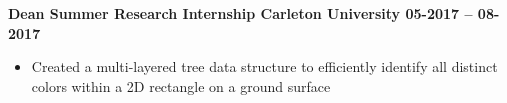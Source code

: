 \textbf{Dean Summer Research Internship \hspace{-11mm} \hfill Carleton University \hfill 05-2017 -- 08-2017}\par

\begin{itemize}
	\item Created a multi-layered tree data structure to efficiently identify all distinct colors within a 2D rectangle on a ground surface
\end{itemize}\par